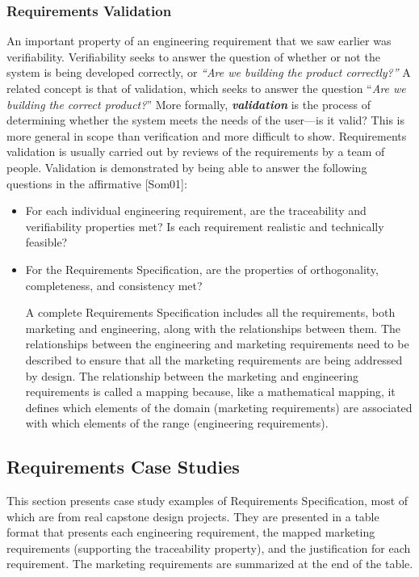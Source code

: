 \subsubsection{Requirements Validation}\label{requirements-validation}

An important property of an engineering requirement that we saw earlier
was verifiability. Verifiability seeks to answer the question of whether
or not the system is being developed correctly, or \emph{``Are we
building the product correctly?''} A related concept is that of
validation, which seeks to answer the question ``\emph{Are we building
the correct product?}'' More formally, \emph{\textbf{validation}} is the
process of determining whether the system meets the needs of the
user---is it valid? This is more general in scope than verification and
more difficult to show. Requirements validation is usually carried out
by reviews of the requirements by a team of people. Validation is
demonstrated by being able to answer the following questions in the
affirmative {[}Som01{]}:

\begin{itemize}
\item
  For each individual engineering requirement, are the traceability and
  verifiability properties met? Is each requirement realistic and
  technically feasible?
\item
  For the Requirements Specification, are the properties of
  orthogonality, completeness, and consistency met?

  A complete Requirements Specification includes all the requirements,
  both marketing and engineering, along with the relationships between
  them. The relationships between the engineering and marketing
  requirements need to be described to ensure that all the marketing
  requirements are being addressed by design. The relationship between
  the marketing and engineering requirements is called a mapping
  because, like a mathematical mapping, it defines which elements of the
  domain (marketing requirements) are associated with which elements of
  the range (engineering requirements).
\end{itemize}

\subsection{Requirements Case Studies}\label{requirements-case-studies}

This section presents case study examples of Requirements Specification,
most of which are from real capstone design projects. They are presented
in a table format that presents each engineering requirement, the mapped
marketing requirements (supporting the traceability property), and the
justification for each requirement. The marketing requirements are
summarized at the end of the table.

